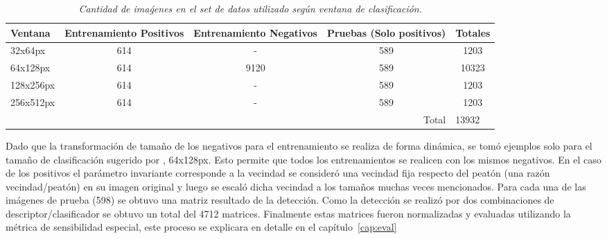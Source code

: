 \begin{table}[htc]
\caption{\em Cantidad de imaǵenes en el set de datos utilizado según ventana de clasificación.}  
  \label{tab:useddataset}
  \resizebox{15cm}{!} {
\begin{tabular}{lcc|c|c|}
\hline
\multicolumn{1}{|l|}{Ventana}   & \multicolumn{1}{c|}{Entrenamiento Positivos} & Entrenamiento Negativos & Pruebas (Solo positivos)   & Totales                    \\ \hline
\multicolumn{1}{|l|}{32x64px}   & \multicolumn{1}{c|}{614}                     & -                       & 589                        & 1203                       \\ \hline
\multicolumn{1}{|l|}{64x128px}  & \multicolumn{1}{c|}{614}                     & 9120                    & 589                        & 10323                      \\ \hline
\multicolumn{1}{|l|}{128x256px} & \multicolumn{1}{c|}{614}                     & -                       & 589                        & 1203                       \\ \hline
\multicolumn{1}{|l|}{256x512px} & \multicolumn{1}{c|}{614}                     & -                       & 589                        & 1203                       \\ \hline
                                & \multicolumn{1}{l}{}                         & \multicolumn{1}{l|}{}   & \multicolumn{1}{r|}{Total} & \multicolumn{1}{l|}{13932} \\ \cline{4-5} 
\end{tabular}}
\end{table}
 
 
Dado que la transformación de tamaño de los negativos para el entrenamiento se realiza de forma dinámica, se tomó ejemplos solo para el tamaño de clasificación sugerido por \cite{dalal2006}, 64x128px. Esto permite que todos los entrenamientos se realicen con los mismos negativos. En el caso de los positivos el parámetro invariante corresponde a la vecindad \ie se consideró una vecindad fija respecto del peatón (una razón vecindad/peatón) en su imagen original y luego se escaló dicha vecindad a los tamaños muchas veces mencionados.
Para cada una de las imágenes de prueba (598) se obtuvo una matriz resultado de la detección. Como la detección se realizó por dos combinaciones de descriptor/clasificador se obtuvo un total del 4712 matrices. Finalmente estas matrices fueron normalizadas y evaluadas utilizando la métrica de sensibilidad especial, este proceso se explicara en detalle en el capítulo~\ref{cap:eval}

